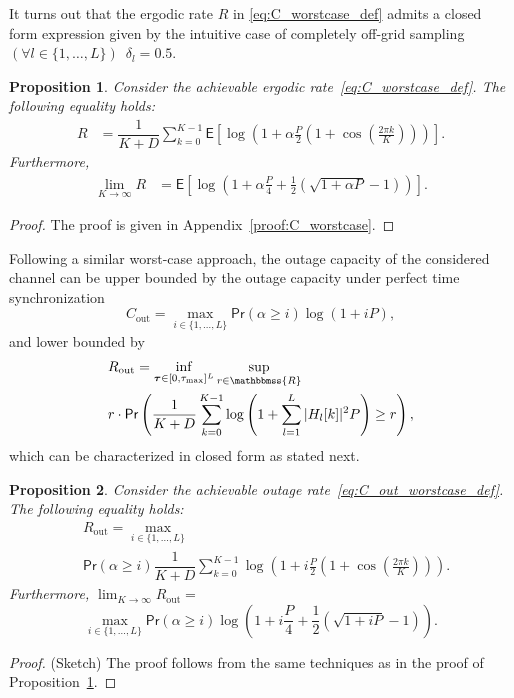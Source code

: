 \documentclass[10pt,journal,a4paper]{IEEEtran}
\newcommand{\E}{\mathsf{E}}		%
\renewcommand{\P}{\mathsf{Pr}} 			%
\newcommand{\stdset}[1]{\mathbbmss{#1}}	%
\renewcommand{\vec}[1]{\bm{#1}}		%
\newtheorem{proposition}{Proposition}
\begin{document}
It turns out that the ergodic rate $R$ in \eqref{eq:C_worstcase_def} admits a closed form expression given by the intuitive case of completely off-grid sampling $(\forall l \in \{1,\ldots,L\})$~$\delta_l=0.5$. 
\begin{proposition}\label{prop:C_worstcase}
Consider the achievable ergodic rate~\eqref{eq:C_worstcase_def}. The following equality holds:
\begin{align*}
R &= \dfrac{1}{K+D}\sum_{k=0}^{K-1}\E\left[\log\left(1+\alpha \frac{P}{2}\left(1+\cos\left(\frac{2\pi k}{K}\right)\right)\right)\right].
\end{align*}
Furthermore, 
\begin{align*}
\lim_{K\to \infty} R &= \E\left[\log\left(1+\alpha \frac{P}{4}+\frac{1}{2}(\sqrt{1+\alpha P}-1)\right)\right].
\end{align*}
\end{proposition}
\begin{proof}
The proof is given in Appendix~\ref{proof:C_worstcase}.
\end{proof}

Following a similar worst-case approach, the outage capacity of the considered channel can be upper bounded by the outage capacity under perfect time synchronization 
\begin{equation*}
C_{\mathrm{out}}=\max_{i\in\{1,\ldots,L\}} \P(\alpha \geq i) \log(1+iP),
\end{equation*}
and lower bounded by
\begin{equation}\label{eq:C_out_worstcase_def}
\begin{split}
&R_{\mathrm{out}}=\inf_{\vec{\tau}\in[0,\tau_{\max}]^L} \sup_{r\in \stdset{R}} \\
&r\cdot\P\left(\dfrac{1}{K+D}\sum_{k=0}^{K-1}\log\left(1+\sum_{l=1}^L|H_l[k]|^2P\right)\geq r\right),
\end{split}
\end{equation}
which can be characterized in closed form as stated next.
\begin{proposition}\label{prop:C_out_worstcase}
Consider the achievable outage rate~\eqref{eq:C_out_worstcase_def}. The following equality holds:
\begin{equation*}
\begin{split}
&R_{\mathrm{out}}= \max_{i\in\{1,\ldots,L\}} \\
& \P(\alpha \geq i)\dfrac{1}{K+D}\sum_{k=0}^{K-1}\log\left(1+i \frac{P}{2}\left(1+\cos\left(\frac{2\pi k}{K}\right)\right)\right).
\end{split}
\end{equation*}
Furthermore, $\lim_{K\to \infty} R_{\mathrm{out}} = $
\begin{equation*}
\max_{i\in\{1,\ldots,L\}}\P(\alpha \geq i)\log\left(1+i\frac{P}{4}+\frac{1}{2}(\sqrt{1+i P}-1)\right).
\end{equation*}
\end{proposition}
\begin{proof}
(Sketch) The proof follows from the same techniques as in the proof of Proposition~\ref{prop:C_worstcase}.
\end{proof}
\end{document}

